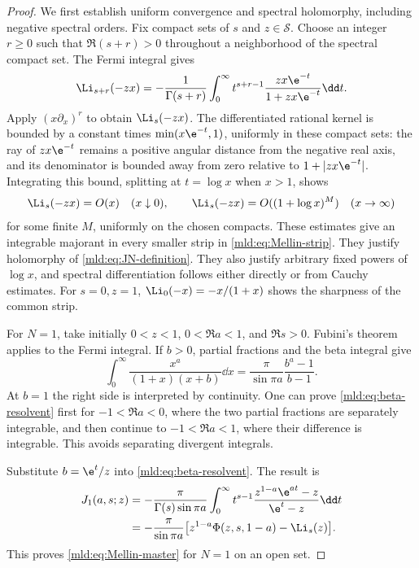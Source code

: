 \begin{proof}
We first establish uniform convergence and spectral holomorphy, including negative spectral orders. Fix compact sets of $s$ and $z\in\mathcal S$. Choose an integer $r\ge0$ such that $\Re(s+r)>0$ throughout a neighborhood of the spectral compact set. The Fermi integral gives
\[
 \Li_{s+r}(-zx)=-\frac1{\Gamma(s+r)}
   \int_0^\infty t^{s+r-1}\frac{zx\e^{-t}}{1+zx\e^{-t}}\dd t.
\]
Apply $(x\partial_x)^r$ to obtain $\Li_s(-zx)$. The differentiated rational kernel is bounded by a constant times $\min(x\e^{-t},1)$, uniformly in these compact sets: the ray of $zx\e^{-t}$ remains a positive angular distance from the negative real axis, and its denominator is bounded away from zero relative to $1+|zx\e^{-t}|$. Integrating this bound, splitting at $t=\log x$ when $x>1$, shows
\[
 \Li_s(-zx)=O(x)\quad(x\downarrow0),\qquad
 \Li_s(-zx)=O((1+\log x)^M)\quad(x\to\infty)
\]
for some finite $M$, uniformly on the chosen compacts. These estimates give an integrable majorant in every smaller strip in \eqref{mld:eq:Mellin-strip}. They justify holomorphy of \eqref{mld:eq:JN-definition}. They also justify arbitrary fixed powers of $\log x$, and spectral differentiation follows either directly or from Cauchy estimates. For $s=0,z=1$, $\Li_0(-x)=-x/(1+x)$ shows the sharpness of the common strip.

For $N=1$, take initially $0<z<1$, $0<\Re a<1$, and $\Re s>0$. Fubini's theorem applies to the Fermi integral. If $b>0$, partial fractions and the beta integral give
\begin{equation}\label{mld:eq:beta-resolvent}
 \int_0^\infty\frac{x^a}{(1+x)(x+b)}\dd x
       =\frac{\pi}{\sin\pi a}\frac{b^a-1}{b-1}.
\end{equation}
At $b=1$ the right side is interpreted by continuity. One can prove \eqref{mld:eq:beta-resolvent} first for $-1<\Re a<0$, where the two partial fractions are separately integrable, and then continue to $-1<\Re a<1$, where their difference is integrable. This avoids separating divergent integrals.

Substitute $b=\e^t/z$ into \eqref{mld:eq:beta-resolvent}. The result is
\begin{align*}
 J_1(a,s;z)
 &=-\frac{\pi}{\Gamma(s)\sin\pi a}
   \int_0^\infty t^{s-1}
      \frac{z^{1-a}\e^{at}-z}{\e^t-z}\dd t\\
 &=-\frac{\pi}{\sin\pi a}
       \big[z^{1-a}\Phi(z,s,1-a)-\Li_s(z)\big].
\end{align*}
This proves \eqref{mld:eq:Mellin-master} for $N=1$ on an open set.


\end{proof}
